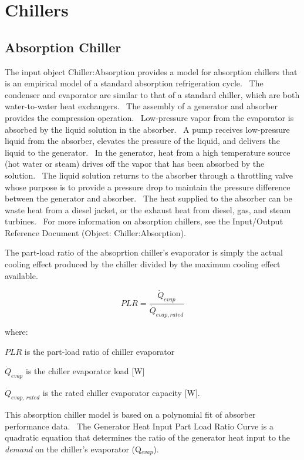 \section{Chillers }\label{chillers}

\subsection{Absorption Chiller}\label{absorption-chiller}

The input object Chiller:Absorption provides a model for absorption chillers that is an empirical model of a standard absorption refrigeration cycle.~ The condenser and evaporator are similar to that of a standard chiller, which are both water-to-water heat exchangers.~ The assembly of a generator and absorber provides the compression operation.~ Low-pressure vapor from the evaporator is absorbed by the liquid solution in the absorber.~ A pump receives low-pressure liquid from the absorber, elevates the pressure of the liquid, and delivers the liquid to the generator.~ In the generator, heat from a high temperature source (hot water or steam) drives off the vapor that has been absorbed by the solution.~ The liquid solution returns to the absorber through a throttling valve whose purpose is to provide a pressure drop to maintain the pressure difference between the generator and absorber.~ The heat supplied to the absorber can be waste heat from a diesel jacket, or the exhaust heat from diesel, gas, and steam turbines.~ For more information on absorption chillers, see the Input/Output Reference Document (Object: Chiller:Absorption).

The part-load ratio of the absoprtion chiller's evaporator is simply the actual cooling effect produced by the chiller divided by the maximum cooling effect available.

\begin{equation}
PLR = \frac{\dot{Q}_{evap}}{\dot{Q}_{evap,rated}}
\end{equation}

where:

\(PLR\) is the part-load ratio of chiller evaporator

\({\dot Q_{evap}}\) is the chiller evaporator load {[}W{]}

\({\dot Q_{evap,\,rated}}\) is the rated chiller evaporator capacity {[}W{]}.

This absorption chiller model is based on a polynomial fit of absorber performance data.~ The Generator Heat Input Part Load Ratio Curve is a quadratic equation that determines the ratio of the generator heat input to the \emph{demand} on the chiller's evaporator (Q\(_{evap}\)).

